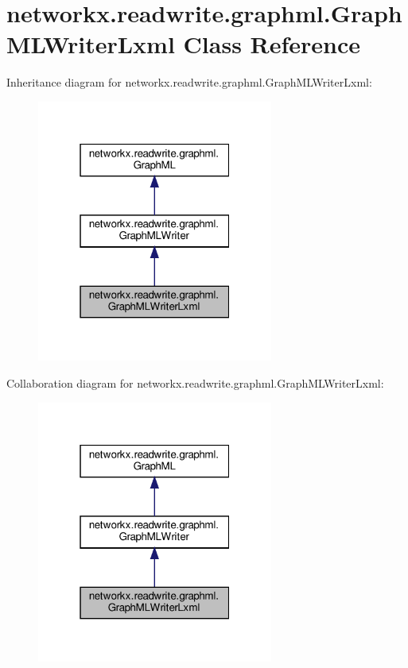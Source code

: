 \hypertarget{classnetworkx_1_1readwrite_1_1graphml_1_1GraphMLWriterLxml}{}\section{networkx.\+readwrite.\+graphml.\+Graph\+M\+L\+Writer\+Lxml Class Reference}
\label{classnetworkx_1_1readwrite_1_1graphml_1_1GraphMLWriterLxml}


Inheritance diagram for networkx.\+readwrite.\+graphml.\+Graph\+M\+L\+Writer\+Lxml\+:
\nopagebreak
\begin{figure}[H]
\begin{center}
\leavevmode
\includegraphics[width=220pt]{classnetworkx_1_1readwrite_1_1graphml_1_1GraphMLWriterLxml__inherit__graph}
\end{center}
\end{figure}


Collaboration diagram for networkx.\+readwrite.\+graphml.\+Graph\+M\+L\+Writer\+Lxml\+:
\nopagebreak
\begin{figure}[H]
\begin{center}
\leavevmode
\includegraphics[width=220pt]{classnetworkx_1_1readwrite_1_1graphml_1_1GraphMLWriterLxml__coll__graph}
\end{center}
\end{figure}
